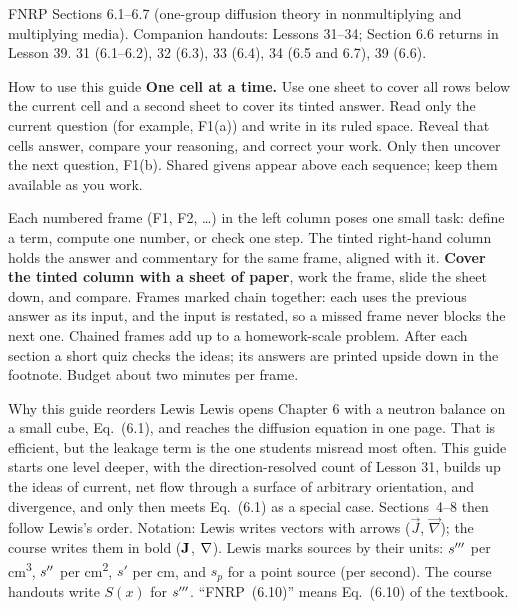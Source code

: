 \documentclass[compact]{ne630handout}
\begin{document}
 {FNRP Sections 6.1--6.7 (one-group diffusion theory in nonmultiplying and multiplying media). Companion handouts: Lessons 31--34; Section 6.6 returns in Lesson 39.}
 {31 (6.1--6.2), 32 (6.3), 33 (6.4), 34 (6.5 and 6.7), 39 (6.6).}

\begin{KeyBox}{How to use this guide}
\ifguidehandwriting
\textbf{One cell at a time.} Use one sheet to cover all rows below the current cell and a second sheet to cover its tinted answer. Read only the current question (for example, F1(a)) and write in its ruled space. Reveal that cell\textquotesingle s answer, compare your reasoning, and correct your work. Only then uncover the next question, F1(b). Shared givens appear above each sequence; keep them available as you work.\par\smallskip
\fi
Each numbered frame (F1, F2, \ldots) in the left column poses one small task: define a term, compute one number, or check one step. The tinted right-hand column holds the answer and commentary for the same frame, aligned with it. \textbf{Cover the tinted column with a sheet of paper}, work the frame, slide the sheet down, and compare. Frames marked \Chain chain together: each uses the previous answer as its input, and the input is restated, so a missed frame never blocks the next one. Chained frames add up to a homework-scale problem. After each section a short quiz checks the ideas; its answers are printed upside down in the footnote. Budget about two minutes per frame.
\end{KeyBox}

\begin{KeyBox}{Why this guide reorders Lewis}
Lewis opens Chapter 6 with a neutron balance on a small cube, Eq.~(6.1), and reaches the diffusion equation in one page. That is efficient, but the leakage term is the one students misread most often. This guide starts one level deeper, with the direction-resolved count of Lesson 31, builds up the ideas of current, net flow through a surface of arbitrary orientation, and divergence, and only then meets Eq.~(6.1) as a special case. Sections~4--8 then follow Lewis's order. Notation: Lewis writes vectors with arrows ($\vec J$, $\vec\nabla$); the course writes them in bold ($\mathbf{J}$, $\nabla$). Lewis marks sources by their units: $s'''$ per \si{\centi\meter\cubed}, $s''$ per \si{\centi\meter\squared}, $s'$ per \si{\centi\meter}, and $s_p$ for a point source (per second). The course handouts write $S(x)$ for $s'''$. ``FNRP~(6.10)'' means Eq.~(6.10) of the textbook.
\end{KeyBox}
\end{document}
